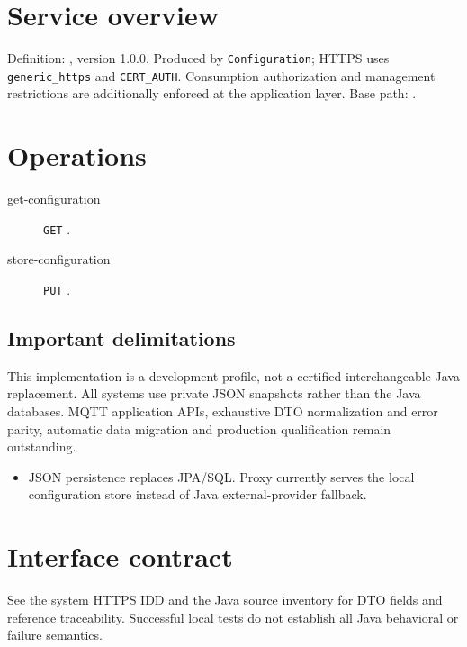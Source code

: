\documentclass[a4paper]{arrowhead}
\begin{document}
\ArrowheadSetup
\section{Service overview}
Definition: , version 1.0.0. Produced by \texttt{Configuration}; HTTPS uses \texttt{generic\_https} and \texttt{CERT\_AUTH}. Consumption authorization and management restrictions are additionally enforced at the application layer. Base path: .
\section{Operations}
\begin{description}
\item[get-configuration] \texttt{GET} .
\item[store-configuration] \texttt{PUT} .
\end{description}
\subsection{Important delimitations}
This implementation is a development profile, not a certified interchangeable Java replacement. All systems use private JSON snapshots rather than the Java databases. MQTT application APIs, exhaustive DTO normalization and error parity, automatic data migration and production qualification remain outstanding.
\begin{itemize}
\item JSON persistence replaces JPA/SQL. Proxy currently serves the local configuration store instead of Java external-provider fallback.
\end{itemize}
\section{Interface contract}
See the system HTTPS IDD and the Java source inventory for DTO fields and reference traceability. Successful local tests do not establish all Java behavioral or failure semantics.
\end{document}
